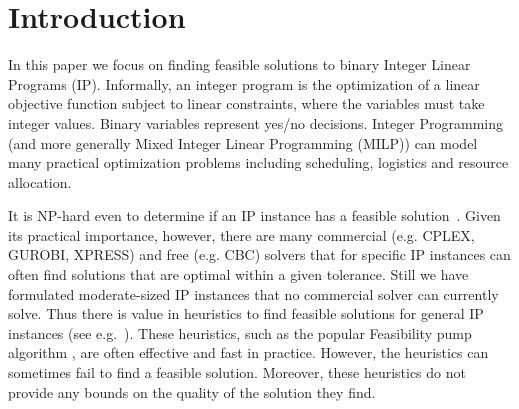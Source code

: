 \nocite{IPbook}

\iffalse{
\section{Introduction}\label{chapter:intro}

In combinatorial optimization the aim is to find the optimal solution in a discrete and
usually finite yet large set of solutions. For many specific combinatorial optimization problems such a solution can be found efficiently. For many others, finding optimal or in many cases near optimal solutions is NP-hard. A common approach to deal with such problems is relaxing the discrete solution set into a continuous set, where the optimization problem becomes tractable. Obtaining feasible solutions by means of such a relaxation requires an additional step of rounding the potentially fractional solution of the continuous relaxation into integer solutions.
}\fi

\section{Introduction}
In this paper we focus on finding feasible solutions to binary Integer Linear Programs (IP). Informally, an integer program is the optimization of a linear objective function subject to linear constraints, where the variables must take integer values. Binary variables represent yes/no decisions. Integer Programming (and more generally Mixed Integer Linear Programming (MILP)) can model many practical optimization problems including scheduling, logistics and resource allocation.

It is  NP-hard even to determine if an IP instance has a feasible solution~\cite{GareyJohnson}. Given its practical importance, however, there are many commercial (e.g. CPLEX, GUROBI, XPRESS) and free (e.g. CBC) solvers that for specific IP instances can often find solutions that are optimal within a given tolerance. Still we have formulated moderate-sized IP instances that no commercial solver can currently solve. Thus there is value in heuristics to find feasible solutions for general IP instances (see e.g.~\cite{HanafiT2017}).
These heuristics, such as the popular Feasibility pump algorithm \cite{fp1,fp2}, are often effective and fast in practice. However, the heuristics can sometimes fail to find a feasible solution. Moreover, these heuristics do not provide any bounds on the quality of the solution they find. 

